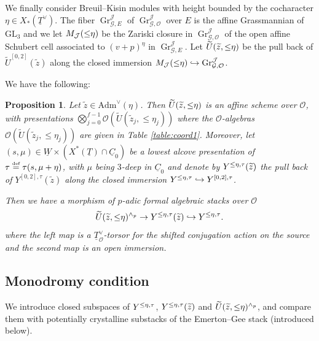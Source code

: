 \documentclass[oneside,a4paper,english, 11pt]{amsart}
\theoremstyle{plain}
\theoremstyle{plain}
\newtheorem{prop}[thm]{Proposition}
\theoremstyle{plain}
\theoremstyle{plain}
\theoremstyle{plain}
\theoremstyle{plain}
\theoremstyle{definition}
\theoremstyle{definition}
\theoremstyle{definition}
\theoremstyle{remark}
\numberwithin{equation}{section}
\newcommand{\cG}{\mathcal{G}}
\newcommand{\cJ}{\mathcal{J}}
\newcommand{\cO}{\mathcal{O}}
\newcommand{\GL}{\mathrm{GL}}
\newcommand{\Adm}{\mathrm{Adm}}
\newcommand{\un}[1]{\underline{#1}}
\newcommand{\tld}[1]{\widetilde{#1}}
\newcommand{\defeq}{\stackrel{\textrm{\tiny{def}}}{=}}
\DeclareMathOperator{\Gr}{Gr}
\DeclareMathOperator{\leqeta}{\text{$\setlength{\thickmuskip}{0mu}\leq\eta$}}
\newcommand{\into}{\hookrightarrow}
\begin{document}
We finally consider Breuil--Kisin modules with height bounded by the cocharacter $\eta\in X_*(\un{T}^\vee)$.
%
The fiber $\Gr^{\cJ}_{\cG,E}$ of $\Gr^{\cJ}_{\cG,\cO}$ over $E$ is the affine Grassmannian of $\GL_3$ and we let $M_{\cJ}(\leqeta)$ be the Zariski closure in $\Gr^{\cJ}_{\cG,\cO}$ of the open affine Schubert cell associated to $(v+p)^\eta$ in $\Gr^{\cJ}_{\cG,E}$.
Let $\tld{U}(\tld{z},\leqeta)$ be the pull back of $\tld{U}^{[0,2]}(\tld{z})$ along the closed immersion $M_{\cJ}(\leqeta)\into \Gr^{\cJ}_{\cG,\cO}$.


We have the following:
\begin{prop}
\label{prop:loc:mod:diag:1}
Let $\tld{z}\in\Adm^{\vee}(\eta)$. 
Then $\tld{U}(\tld{z},\leqeta)$ is an affine scheme over $\cO$, with presentations $\bigotimes_{j=0}^{f-1}\cO(\tld{U}(\tld{z}_j, \leq\!\eta_j))$ where the $\cO$-algebras $\cO(\tld{U}(\tld{z}_j, \leq\!\eta_j))$ are given in Table \ref{table:coord1}.
%
Moreover, let $(s,\mu)\in \un{W}\times (X^*(\un{T})\cap \un{C}_0)$ be a lowest alcove presentation of $\tau\defeq \tau(s,\mu+\eta)$, with $\mu$ being $3$-deep in $\un{C}_0$ and denote by $Y^{\leqeta,\tau}(\tld{z})$ the pull back of $Y^{[0,2],\tau}(\tld{z})$ along the closed immersion $Y^{\leqeta,\tau}\into Y^{[0,2],\tau}$.

Then we have a morphism of $p$-adic formal algebraic stacks over $\cO$
\begin{equation}
\label{eq:LMD:1}
\tld{U}(\tld{z},\leqeta)^{\wedge_p}\rightarrow  Y^{\leqeta,\tau}(\tld{z})\into Y^{\leqeta,\tau}.
\end{equation}
where the left map is a $\un{T}^{\vee}_{\cO}$-torsor for the shifted conjugation action on the source and the second map is an open immersion.
\end{prop} 
%


%
%












\subsection{Monodromy condition}
\label{sub:Mon:Cond}

We introduce closed subspaces of $Y^{\leqeta,\tau}$, $Y^{\leqeta,\tau}(\tld{z})$ and $\tld{U}(\tld{z},\leqeta)^{\wedge_p}$, and compare them with potentially crystalline substacks of the Emerton--Gee stack (introduced below).
\end{document}

